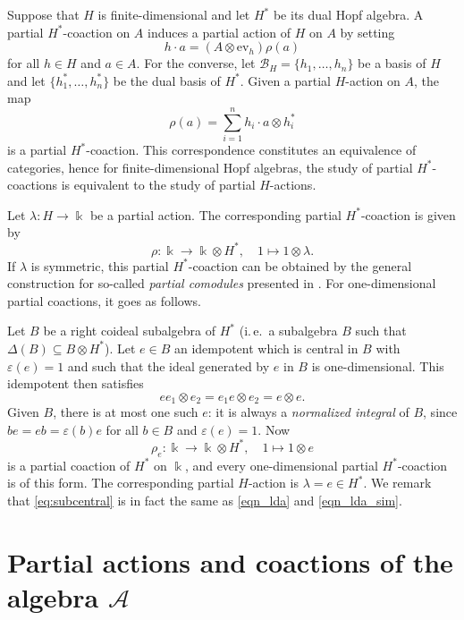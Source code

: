\documentclass[reqno]{amsart}
\theoremstyle{definition}
\numberwithin{equation}{section}\theoremstyle{plain}
\newcommand{\B}{\mathcal{B}}
\theoremstyle{definition}
\def \A {\mathcal{A}}
\begin{document}
    \medbreak
    
    Suppose that \(H\) is finite-dimensional and let \(H^*\) be its dual Hopf algebra. A partial \(H^*\)-coaction on \(A\) induces a partial action of \(H\) on \(A\) by setting
    \[h \cdot a = (A \otimes \mathrm{ev}_h) \rho(a)\]
    for all \(h \in H\) and \(a \in A\). For the converse, let \(\B_H = \{h_1, \dots, h_n\}\) be a basis of \(H\) and let \(\{h_1^*, \dots, h_n^*\}\) be the dual basis of \(H^*\). Given a partial \(H\)-action on \(A\), the map
    \[\rho(a) = \sum_{i = 1}^n h_i \cdot a \otimes h_i^*\]
    is a partial \(H^*\)-coaction. This correspondence constitutes an equivalence of categories, hence for finite-dimensional Hopf algebras, the study of partial \(H^*\)-coactions is equivalent to the study of partial \(H\)-actions.
    
     Let \(\lambda : H \to \Bbbk\) be a partial action. The corresponding partial \(H^*\)-coaction is given by 
     \[\rho : \Bbbk \to \Bbbk \otimes H^*,\quad 1 \mapsto 1 \otimes \lambda.\]
    If \(\lambda\) is symmetric, this partial \(H^*\)-coaction can be obtained by the general construction for so-called \textit{partial comodules} presented in \cite{BHSV}. For one-dimensional partial coactions, it goes as follows.

    Let \(B\) be a right coideal subalgebra of \(H^*\) (i.\,e.\ a subalgebra \(B\) such that \(\Delta(B) \subseteq B \otimes H^*\)). Let \(e \in B\) an idempotent which is central in \(B\) with \(\varepsilon(e) = 1\) and such that the ideal generated by \(e\) in \(B\) is one-dimensional. This idempotent then satisfies 
    \begin{equation}
    \label{eq:subcentral}
        ee_1 \otimes e_2 = e_1 e \otimes e_2 = e \otimes e.
    \end{equation}
    Given \(B\), there is at most one such \(e\): it is always a \textit{normalized integral} of \(B\), since \(be = eb = \varepsilon(b) e\) for all \(b \in B\) and \(\varepsilon(e) = 1\).
    Now
    \[\rho_e : \Bbbk \to \Bbbk \otimes H^*, \quad 1 \mapsto 1 \otimes e\]
    is a partial coaction of \(H^*\) on \(\Bbbk\), and every one-dimensional partial \(H^*\)-coaction is of this form. The corresponding partial \(H\)-action is \(\lambda = e \in H^*\). We remark that \eqref{eq:subcentral} is in fact the same as \eqref{eqn_lda} and \eqref{eqn_lda_sim}.

\section{Partial actions and coactions of the algebra \texorpdfstring{$\A$}{A}}\label{sec_A}
\end{document}
